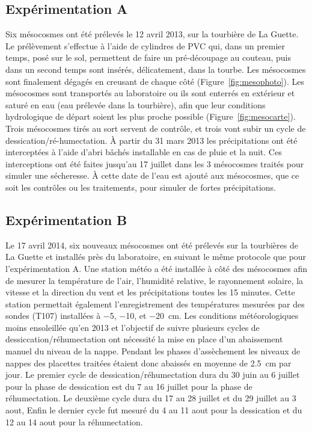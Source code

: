 \subsection{Expérimentation A}
Six mésocosmes ont été prélevés le 12 avril 2013, sur la tourbière de La Guette.
Le prélèvement s'effectue à l'aide de cylindres de PVC qui, dans un premier temps, posé sur le sol, permettent de faire un pré-découpage au couteau, puis dans un second temps sont insérés, délicatement, dans la tourbe. 
Les mésocosmes sont finalement dégagés en creusant de chaque côté (Figure~\ref{fig:mesophoto}).
Les mésocosmes sont transportés au laboratoire ou ils sont enterrés en extérieur et saturé en eau (eau prélevée dans la tourbière), afin que leur conditions hydrologique de départ soient les plus proche possible (Figure~\ref{fig:mesocarte}).
Trois mésocosmes tirés au sort servent de contrôle, et trois vont subir un cycle de dessication/ré-humectation.
À partir du 31 mars 2013 les précipitations ont été interceptées à l'aide d'abri bâchés installable en cas de pluie et la nuit.
Ces interceptions ont été faites jusqu'au 17 juillet dans les 3 mésocosmes traités pour simuler une sécheresse.
À cette date de l'eau est ajouté aux mésocosmes, que ce soit les contrôles ou les traitements, pour simuler de fortes précipitations.

\subsection{Expérimentation B}
Le 17 avril 2014, six nouveaux mésocosmes ont été prélevés sur la tourbières de La Guette et installés près du laboratoire, en suivant le même protocole que pour l'expérimentation A.
Une station météo a été installée à côté des mésocosmes afin de mesurer la température de l'air, l'humidité relative, le rayonnement solaire, la vitesse et la direction du vent et les précipitations toutes les 15 minutes.
Cette station permettait également l'enregistrement des températures mesurées par des sondes (T107) installées à \num{-5}, \num{-10}, et \SI{-20}{\centi\metre}.
Les conditions météorologiques moins ensoleillée qu'en 2013 et l'objectif de suivre plusieurs cycles de dessiccation/réhumectation ont nécessité la mise en place d'un abaissement manuel du niveau de la nappe.
Pendant les phases d'assèchement les niveaux de nappes des placettes traitées étaient donc abaissés en moyenne de \SI{2.5}{\centi\metre} par jour.
Le premier cycle de dessication/réhumectation dura du 30 juin au 6 juillet pour la phase de dessication est du 7 au 16 juillet pour la phase de réhumectation.
Le deuxième cycle dura du 17 au 28 juillet et du 29 juillet au 3 aout, 
Enfin le dernier cycle fut mesuré du 4 au 11 aout pour la dessication et du 12 au 14 aout pour la réhumectation.

